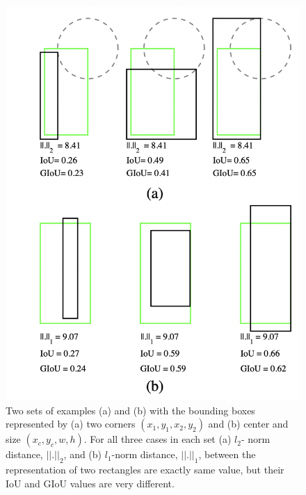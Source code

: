 \documentclass[12pt]{article}
\begin{document}
\begin{figure}[h]
    \centering
    \includegraphics[scale=0.50]{l1_loss.png}
    \caption{Two sets of examples (a) and (b) with the bounding boxes represented by (a) two corners $(x_{1} , y_{1} , x_{2} , y_{2} )$ and (b) center and size $(x_{c}, y_{c}, w, h)$. For all three cases in each set (a) $l_{2}$- norm distance, $||.||_{2}$, and (b) $l_{1}$-norm distance, $||.||_{1}$, between the representation of two rectangles are exactly same value, but their IoU and GIoU values are very different.
}
    \label{fig:mesh6}
\end{figure}
\end{document}

